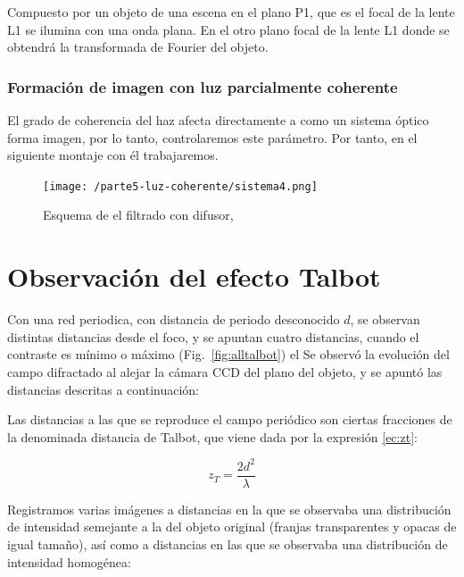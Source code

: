 \documentclass{./packages/optica-article}
\begin{document}
	      Compuesto por un objeto de una escena en el plano P1, que es el focal de la lente L1 se ilumina con una onda plana. En el otro plano focal de la lente L1 donde se obtendrá la transformada de Fourier del objeto.

\subsubsection{Formación de imagen con luz parcialmente coherente}

	      El grado de coherencia del haz afecta directamente a como un sistema óptico forma imagen, por lo tanto, controlaremos este parámetro. Por tanto, en el siguiente montaje con él trabajaremos.

	      \begin{figure}[h]
		      \centering
		      \texttt{[image: /parte5-luz-coherente/sistema4.png]}
		      \caption{Esquema de el filtrado con difusor, }
		      \label{fig:coherenciaespacial}
	      \end{figure}


\section{Observación del efecto Talbot}
Con una red periodica, con distancia de periodo desconocido $d$, se observan  distintas distancias desde el foco, y se apuntan cuatro distancias, cuando el contraste es mínimo o máximo (Fig.~\ref{fig:alltalbot}) el Se observó la evolución del campo difractado al alejar la cámara CCD del plano del objeto, y se apuntó las distancias descritas a continuación:

Las distancias a las que se reproduce el campo periódico son ciertas fracciones de la denominada distancia de Talbot, que viene dada por la expresión \ref{ec:zt}:

\begin{center}
	\begin{equation}
		z_T = \frac{2d^2}{\lambda}
		\label{ec:zt}
	\end{equation}
\end{center}


Registramos varias imágenes a distancias en la que se observaba una distribución de intensidad semejante a la del objeto original (franjas transparentes y opacas de igual tamaño), así como a distancias en las que se observaba una distribución de intensidad homogénea:\par
\end{document}
